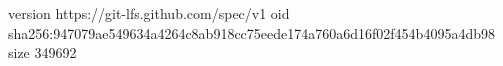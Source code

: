 version https://git-lfs.github.com/spec/v1
oid sha256:947079ae549634a4264c8ab918cc75eede174a760a6d16f02f454b4095a4db98
size 349692

